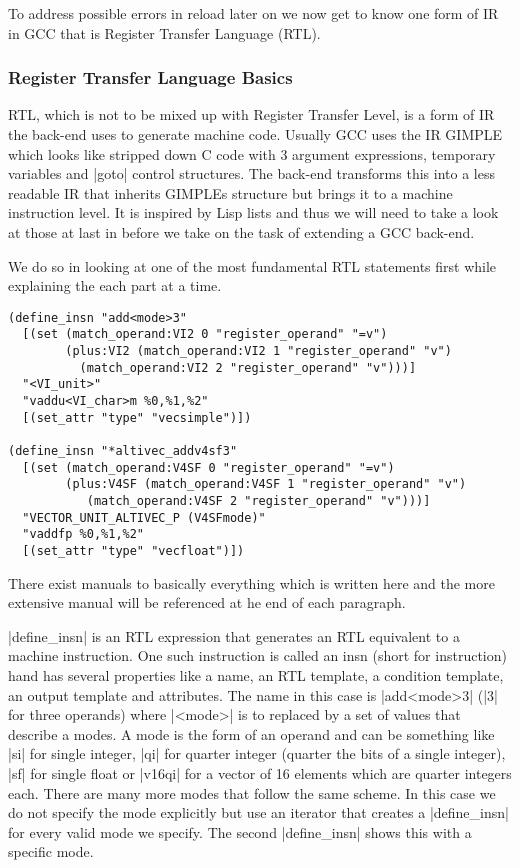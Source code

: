 To address possible errors in reload later on we now get to know one form of IR in GCC that is Register Transfer Language (RTL).

\subsubsection{Register Transfer Language Basics}
RTL, which is not to be mixed up with Register Transfer Level, is a form of IR the back-end uses to generate machine code.
Usually GCC uses the IR GIMPLE which looks like stripped down C code with 3 argument expressions, temporary variables and |goto| control structures.
The back-end transforms this into a less readable IR that inherits GIMPLEs structure but brings it to a machine instruction level.
It is inspired by Lisp lists and thus we will need to take a look at those at last in before we take on the task of extending a GCC back-end.

We do so in looking at one of the most fundamental RTL statements first while explaining the each part at a time.

\begin{lstlisting}
(define_insn "add<mode>3"
  [(set (match_operand:VI2 0 "register_operand" "=v")
        (plus:VI2 (match_operand:VI2 1 "register_operand" "v")
		  (match_operand:VI2 2 "register_operand" "v")))]
  "<VI_unit>"
  "vaddu<VI_char>m %0,%1,%2"
  [(set_attr "type" "vecsimple")])

(define_insn "*altivec_addv4sf3"
  [(set (match_operand:V4SF 0 "register_operand" "=v")
        (plus:V4SF (match_operand:V4SF 1 "register_operand" "v")
		   (match_operand:V4SF 2 "register_operand" "v")))]
  "VECTOR_UNIT_ALTIVEC_P (V4SFmode)"
  "vaddfp %0,%1,%2"
  [(set_attr "type" "vecfloat")])
\end{lstlisting}

There exist manuals to basically everything which is written here and the more extensive manual will be referenced at he end of each paragraph.

|define_insn| is an RTL expression that generates an RTL equivalent to a machine instruction.
One such instruction is called an insn (short for instruction) hand has several properties like a name, an RTL template, a condition template, an output template and attributes. 
The name in this case is |add<mode>3| (|3| for three operands) where |<mode>| is to replaced by a set of values that describe a modes. 
A mode is the form of an operand and can be something like |si| for single integer, |qi| for quarter integer (quarter the bits of a single integer), |sf| for single float or |v16qi| for a vector of 16 elements which are quarter integers each. 
There are many more modes that follow the same scheme.
In this case we do not specify the mode explicitly but use an iterator that creates a |define_insn| for every valid mode we specify. 
The second |define_insn| shows this with a specific mode.

